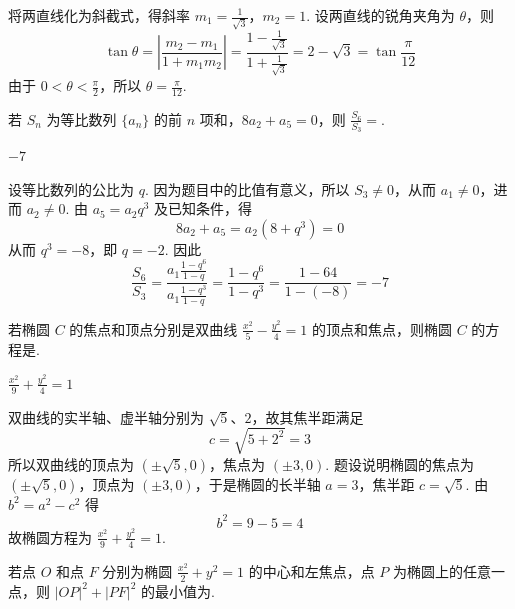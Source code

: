 \begin{solution}
将两直线化为斜截式，得斜率
\(m_1=\frac{1}{\sqrt{3}}\)，\(m_2=1\).
设两直线的锐角夹角为 \(\theta\)，则
\[
\tan\theta=\left|\frac{m_2-m_1}{1+m_1m_2}\right|
 =\frac{1-\frac{1}{\sqrt{3}}}{1+\frac{1}{\sqrt{3}}}
 =2-\sqrt{3}=\tan\frac{\pi}{12}
\]
由于 \(0<\theta<\frac{\pi}{2}\)，所以 \(\theta=\frac{\pi}{12}\).
\end{solution}

\begin{problem}
若 \( S_{n} \) 为等比数列 \( \{a_{n}\} \) 的前 \(n\) 项和，\( 8a_{2} + a_{5} = 0 \)，则 \( \frac{S_{6}}{S_{3}} = \)\fillinblank{}.
\end{problem}

\begin{answer}
\(-7\)
\end{answer}

\begin{solution}
设等比数列的公比为 \(q\). 因为题目中的比值有意义，所以 \(S_3\ne0\)，从而 \(a_1\ne0\)，进而 \(a_2\ne0\). 由 \(a_5=a_2q^3\) 及已知条件，得
\[
8a_2+a_5=a_2(8+q^3)=0
\]
从而 \(q^3=-8\)，即 \(q=-2\). 因此
\[
\frac{S_6}{S_3}
 =\frac{a_1\frac{1-q^6}{1-q}}{a_1\frac{1-q^3}{1-q}}
 =\frac{1-q^6}{1-q^3}
 =\frac{1-64}{1-(-8)}=-7
\]
\end{solution}

\begin{problem}
若椭圆 \(C\) 的焦点和顶点分别是双曲线 \( \frac{x^{2}}{5}-\frac{y^{2}}{4}=1 \) 的顶点和焦点，则椭圆 \(C\) 的方程是\fillinblank{}.
\end{problem}

\begin{answer}
\(\frac{x^2}{9}+\frac{y^2}{4}=1\)
\end{answer}

\begin{solution}
双曲线的实半轴、虚半轴分别为 \(\sqrt{5}\)、\(2\)，故其焦半距满足
\[
c=\sqrt{5+2^2}=3
\]
所以双曲线的顶点为 \((\pm\sqrt{5},0)\)，焦点为 \((\pm3,0)\). 题设说明椭圆的焦点为 \((\pm\sqrt{5},0)\)，顶点为 \((\pm3,0)\)，于是椭圆的长半轴 \(a=3\)，焦半距 \(c=\sqrt{5}\). 由 \(b^2=a^2-c^2\) 得
\[
b^2=9-5=4
\]
故椭圆方程为 \(\frac{x^2}{9}+\frac{y^2}{4}=1\).
\end{solution}

\begin{problem}
若点 \(O\) 和点 \(F\) 分别为椭圆 \(\frac{x^2}{2} + y^2 = 1\) 的中心和左焦点，点 \(P\) 为椭圆上的任意一点，则 \(|OP|^2 + |PF|^2\) 的最小值为\fillinblank{}.
\end{problem}

